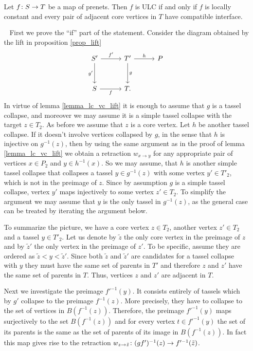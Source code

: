 \documentclass[letterpaper,12pt,leqno]{article}
\numberwithin{equation}{theorem}
\def\proof{\noindent{\em Proof:}\ }
\begin{document}
\begin{lemma}
\label{lemma_ulc_criterion}
Let $f\colon S \to T$ be a map of prenets. Then $f$ is ULC if and only if $f$ is locally constant and every pair of adjacent core vertices in $T$ have compatible interface.
\end{lemma}
\proof
First we prove the ``if'' part of the statement. Consider the diagram obtained by the lift in proposition \ref{prop_lift}
$$
\begin{tikzcd}[sep=3em]
S' \ar[d, "g'"'] \ar[r, "f'"] & T' \ar[d, "g"] \ar[r, "h"] & P \\
S \ar[r, "f"'] & T. &
\end{tikzcd}
$$
In virtue of lemma \ref{lemma_lc_vc_lift} it is enough to assume that $g$ is a tassel collapse, and moreover we may assume it is a simple tassel collapse with the target $z \in T_2$.
As before we assume that $z$ is a core vertex.
Let $h$ be another tassel collapse. If it doesn't involve vertices collapsed by $g$, in the sense that $h$ is injective on $g^{-1}(z)$, then by using the same argument as in the
proof of lemma \ref{lemma_lc_vc_lift} we obtain a retraction $w_{x \to y}$ for any appropriate pair of vertices $x \in P_2$ and $y \in h^{-1}(x)$. So we may assume, that $h$
is another simple tassel collapse that collapses a tassel $y \in g^{-1}(z)$ with some vertex $y' \in T'_2$, which is not in the preimage of $z$. Since by assumption $g$ is a simple
tassel collapse, vertex $y'$ maps injectively to some vertex $z' \in T_2$. To simplify the argument we may assume that $y$ is the only tassel in $g^{-1}(z)$, as the general case
can be treated by iterating the argument below.

To summarize the picture, we have a core vertex $z \in T_2$, another vertex $z' \in T_2$ and a tassel $y \in T'_2$. Let us denote by $\tilde z$ the only core vertex in the preimage of $z$
and by $\tilde z'$ the only vertex in the preimage of $z'$. To be specific, assume they are ordered as $\tilde z < y < \tilde z'$. Since both $\tilde z$ and $\tilde z'$ are candidates for
a tassel collapse with $y$ they must have the same set of parents in $T'$ and therefore $z$ and $z'$ have the same set of parents in $T$. Thus, vertices $z$ and $z'$ are adjacent in $T$.

Next we investigate the preimage $f'^{-1}(y)$. It consists entirely of tassels which by $g'$ collapse to the preimage $f^{-1}(z)$. More precisely, they have to collapse to the set of vertices
in $B(f^{-1}(z))$. Therefore, the preimage $f'^{-1}(y)$ maps surjectively to the set $B(f^{-1}(z))$ and for every vertex $t \in f'^{-1}(y)$ the set of its parents is the same as the set of
parents of its image in $B(f^{-1}(z))$. In fact this map gives rise to the retraction $w_{z \to \tilde z} \colon (gf')^{-1}(z) \to f'^{-1}(\tilde z)$.
\end{document}

